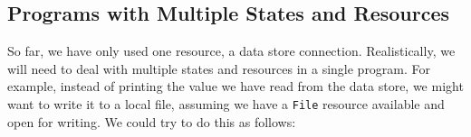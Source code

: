 




\subsection{Programs with Multiple States and Resources}

\label{sect:multiplests}

So far, we have only used one resource, a data store connection. Realistically,
we will need to deal with multiple states and resources in a single program.
For example, instead of printing the value we have read from the data store, we
might want to write it to a local file, assuming we have a \texttt{File}
resource available and open for writing. We could try to do this as follows:

